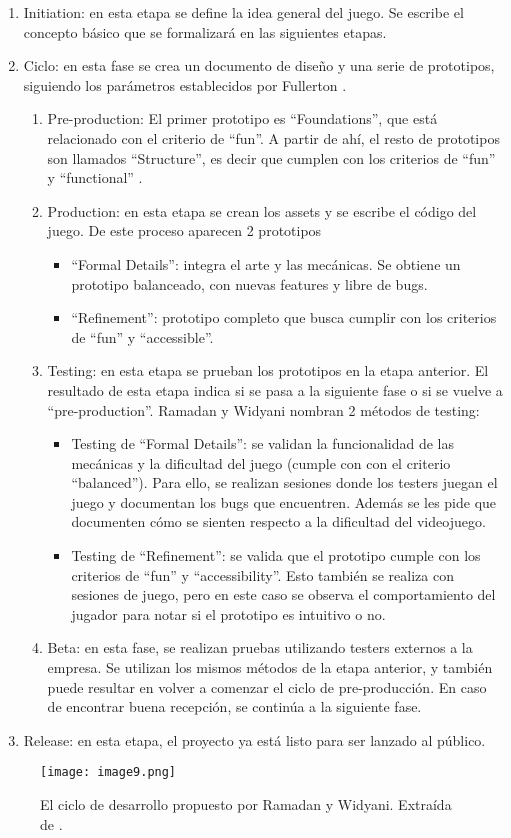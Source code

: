 \begin{enumerate}
    \item Initiation: en esta etapa se define la idea general del juego. Se escribe el concepto básico que se formalizará en las siguientes etapas.
    \item Ciclo: en esta fase se crea un documento de diseño y una serie de prototipos, siguiendo los parámetros establecidos por Fullerton \cite{fullertonGameDesignWorkshop2008}.
    \begin{enumerate}
        \item Pre-production: El primer prototipo es “Foundations”, que está relacionado con el criterio de “fun”. A partir de ahí, el resto de prototipos son llamados “Structure”, es decir que cumplen con los criterios de “fun” y “functional” \cite{ramadanGameDevelopmentLife2013}.
        \item Production: en esta etapa se crean los assets y se escribe el código del juego. De este proceso aparecen 2 prototipos 
        \begin{itemize}
            \item “Formal Details”: integra el arte y las mecánicas. Se obtiene un prototipo balanceado, con nuevas features y libre de bugs.
            \item “Refinement”: prototipo completo que busca cumplir con los criterios de “fun” y “accessible”.
        \end{itemize}
        \item Testing: en esta etapa se prueban los prototipos en la etapa anterior. El resultado de esta etapa indica si se pasa a la siguiente fase o si se vuelve a “pre-production”. Ramadan y Widyani \cite{ramadanGameDevelopmentLife2013} nombran 2 métodos de testing:
        \begin{itemize}
            \item Testing de “Formal Details”: se validan la funcionalidad de las mecánicas y la dificultad del juego (cumple con con el criterio “balanced”). Para ello, se realizan sesiones donde los testers juegan el juego y documentan los bugs que encuentren. Además se les pide que documenten cómo se sienten respecto a la dificultad del videojuego.
            \item Testing de “Refinement”: se valida que el prototipo cumple con los criterios de “fun” y “accessibility”. Esto también se realiza con sesiones de juego, pero en este caso se observa el comportamiento del jugador para notar si el prototipo es intuitivo o no.
        \end{itemize}
        \item Beta: en esta fase, se realizan pruebas utilizando testers externos a la empresa. Se utilizan los mismos métodos de la etapa anterior, y también puede resultar en volver a comenzar el ciclo de pre-producción. En caso de encontrar buena recepción, se continúa a la siguiente fase.
    \end{enumerate}
    \item Release: en esta etapa, el proyecto ya está listo para ser lanzado al público.
\end{enumerate}
\begin{figure}[H]
  \centering
  \texttt{[image: image9.png]}
  \caption{El ciclo de desarrollo propuesto por Ramadan y Widyani. Extraída de \cite{ramadanGameDevelopmentLife2013}.}
  \label{fig:x gdlc Ramadan y Widyani}
\end{figure}